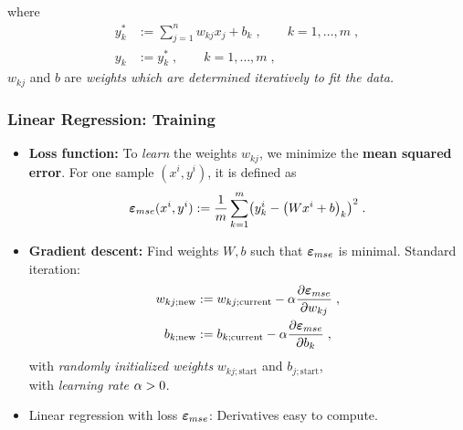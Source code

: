 \documentclass[10pt,hyperref={pdfpagelabels=false}]{beamer}
\begin{document}
\begin{frame}[allowframebreaks]
\begin{itemize}
        where
        {\small
        \begin{equation*}
            \begin{split}
                y^\ast_k &:= \sum_{j=1}^n w_{kj}x_j + b_k
                \;, \qquad k=1,\dots, m
                \;,\\
                y_k & := y^\ast_k
                \;, \qquad k=1,\dots, m
                \;,
            \end{split}
        \end{equation*}
        $w_{kj}$ and $b$ are \emph{weights which are determined iteratively to fit the data.}}
    \end{itemize}
\end{frame}
\begin{frame}
    \frametitle{Linear Regression: Training}
    \begin{itemize}
        \item {\bf Loss function: } To \emph{learn} the weights $w_{kj}$, we minimize the {\bf mean squared error}. For one sample $(x^i, y^i)$, it is defined as
        $$
        \mse(x^i, y^i):=\frac{1}{m}\sum_{k=1}^m \left(y^i_k - \left(Wx^i+b\right)_k\right)^2
        \;.
        $$
        \item {\bf Gradient descent:} Find weights $W, b$ such that $\boldsymbol{\varepsilon}_{mse}$ is minimal. Standard iteration:
        \begin{equation*}
            \begin{split}
                w_{kj; \text{new}} &:= w_{kj; \text{current}} - \alpha \frac{\partial \boldsymbol{\varepsilon}_{mse}}{\partial w_{kj}}
                \;,\\
                b_{k; \text{new}} &:= b_{k; \text{current}} - \alpha \frac{\partial \boldsymbol{\varepsilon}_{mse}}{\partial b_k}
                \;,
            \end{split}
        \end{equation*}
        with \emph{randomly initialized weights} $w_{kj; \text{start}}$ and $b_{j; \text{start}}$,\\
        with \emph{learning rate} $\alpha>0$.
        \item Linear regression with loss $\boldsymbol{\varepsilon}_{mse}$: Derivatives easy to compute.
    \end{itemize}
\end{frame}
\end{document}
